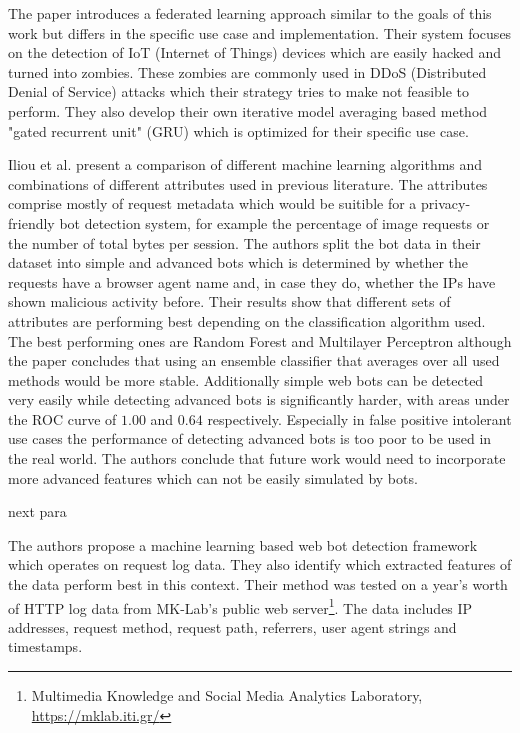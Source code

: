 \documentclass[
    fontsize=12pt,
    headings=small,
    parskip=half,           %
    bibliography=totoc,
    numbers=noenddot,       %
    open=any,               %
    final                   %
]{scrreprt}
\begin{document}
The paper \cite{LiJi2021} introduces a federated learning approach similar to the goals of this work but differs in the specific use case and implementation. Their system focuses on the detection of IoT (Internet of Things) devices which are easily hacked and turned into zombies. These zombies are commonly used in DDoS (Distributed Denial of Service) attacks which their strategy tries to make not feasible to perform. They also develop their own iterative model averaging based method "gated recurrent unit" (GRU) which is optimized for their specific use case.

Iliou et al. \cite{10.1145/3339252.3339267} present a comparison of different machine learning algorithms and combinations of different attributes used in previous literature. The attributes comprise mostly of request metadata which would be suitible for a privacy-friendly bot detection system, for example the percentage of image requests or the number of total bytes per session. The authors split the bot data in their dataset into simple and advanced bots which is determined by whether the requests have a browser agent name and, in case they do, whether the IPs have shown malicious activity before. Their results show that different sets of attributes are performing best depending on the classification algorithm used. The best performing ones are Random Forest and Multilayer Perceptron although the paper concludes that using an ensemble classifier that averages over all used methods would be more stable. Additionally simple web bots can be detected very easily while detecting advanced bots is significantly harder, with areas under the ROC curve of $1.00$ and $0.64$ respectively. Especially in false positive intolerant use cases the performance of detecting advanced bots is too poor to be used in the real world. The authors conclude that future work would need to incorporate more advanced features which can not be easily simulated by bots.

\todo next para

The authors propose a machine learning based web bot detection framework which operates on request log data. They also identify which extracted features of the data perform best in this context. Their method was tested on a year's worth of HTTP log data from MK-Lab's public web server\footnote{Multimedia Knowledge and Social Media Analytics Laboratory, \url{https://mklab.iti.gr/}}. The data includes IP addresses, request method, request path, referrers, user agent strings and timestamps.
\end{document}
